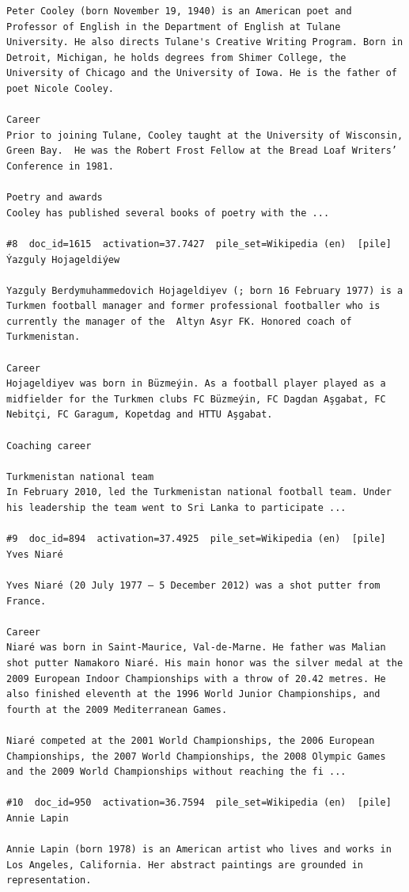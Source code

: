 \begin{verbatim}
Peter Cooley (born November 19, 1940) is an American poet and Professor of English in the Department of English at Tulane University. He also directs Tulane's Creative Writing Program. Born in Detroit, Michigan, he holds degrees from Shimer College, the University of Chicago and the University of Iowa. He is the father of poet Nicole Cooley.

Career
Prior to joining Tulane, Cooley taught at the University of Wisconsin, Green Bay.  He was the Robert Frost Fellow at the Bread Loaf Writers’ Conference in 1981.

Poetry and awards
Cooley has published several books of poetry with the ...

#8  doc_id=1615  activation=37.7427  pile_set=Wikipedia (en)  [pile]
Ýazguly Hojageldiýew

Yazguly Berdymuhammedovich Hojageldiyev (; born 16 February 1977) is a Turkmen football manager and former professional footballer who is currently the manager of the  Altyn Asyr FK. Honored coach of Turkmenistan.

Career 
Hojageldiyev was born in Büzmeýin. As a football player played as a midfielder for the Turkmen clubs FC Büzmeýin, FC Dagdan Aşgabat, FC Nebitçi, FC Garagum, Kopetdag and HTTU Aşgabat.

Coaching career

Turkmenistan national team 
In February 2010, led the Turkmenistan national football team. Under his leadership the team went to Sri Lanka to participate ...

#9  doc_id=894  activation=37.4925  pile_set=Wikipedia (en)  [pile]
Yves Niaré

Yves Niaré (20 July 1977 – 5 December 2012) was a shot putter from France.

Career
Niaré was born in Saint-Maurice, Val-de-Marne. He father was Malian shot putter Namakoro Niaré. His main honor was the silver medal at the 2009 European Indoor Championships with a throw of 20.42 metres. He also finished eleventh at the 1996 World Junior Championships, and fourth at the 2009 Mediterranean Games.

Niaré competed at the 2001 World Championships, the 2006 European Championships, the 2007 World Championships, the 2008 Olympic Games and the 2009 World Championships without reaching the fi ...

#10  doc_id=950  activation=36.7594  pile_set=Wikipedia (en)  [pile]
Annie Lapin

Annie Lapin (born 1978) is an American artist who lives and works in Los Angeles, California. Her abstract paintings are grounded in representation.


\end{verbatim}
